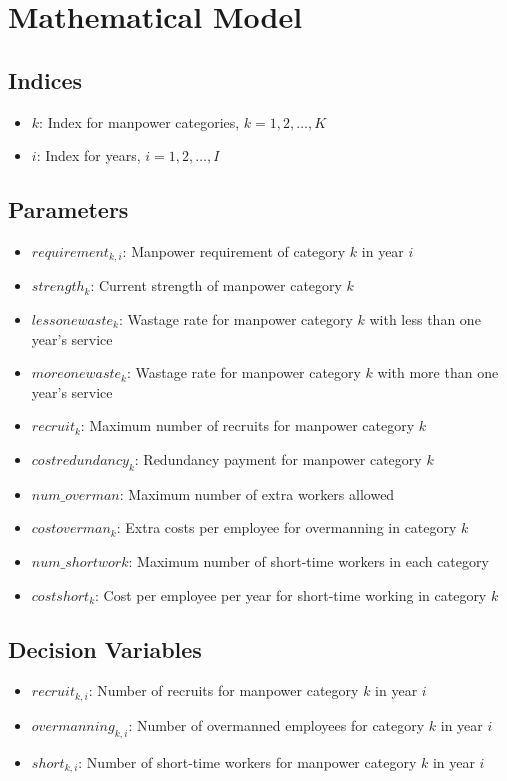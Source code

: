 \documentclass{article}
\begin{document}
\section*{Mathematical Model}

\subsection*{Indices}
\begin{itemize}
    \item \( k \): Index for manpower categories, \( k = 1, 2, \ldots, K \)
    \item \( i \): Index for years, \( i = 1, 2, \ldots, I \)
\end{itemize}

\subsection*{Parameters}
\begin{itemize}
    \item \( requirement_{k,i} \): Manpower requirement of category \( k \) in year \( i \)
    \item \( strength_k \): Current strength of manpower category \( k \)
    \item \( lessonewaste_k \): Wastage rate for manpower category \( k \) with less than one year's service
    \item \( moreonewaste_k \): Wastage rate for manpower category \( k \) with more than one year's service
    \item \( recruit_k \): Maximum number of recruits for manpower category \( k \)
    \item \( costredundancy_k \): Redundancy payment for manpower category \( k \)
    \item \( num\_overman \): Maximum number of extra workers allowed
    \item \( costoverman_k \): Extra costs per employee for overmanning in category \( k \)
    \item \( num\_shortwork \): Maximum number of short-time workers in each category
    \item \( costshort_k \): Cost per employee per year for short-time working in category \( k \)
\end{itemize}

\subsection*{Decision Variables}
\begin{itemize}
    \item \( recruit_{k,i} \): Number of recruits for manpower category \( k \) in year \( i \)
    \item \( overmanning_{k,i} \): Number of overmanned employees for category \( k \) in year \( i \)
    \item \( short_{k,i} \): Number of short-time workers for manpower category \( k \) in year \( i \)
\end{itemize}
\end{document}
